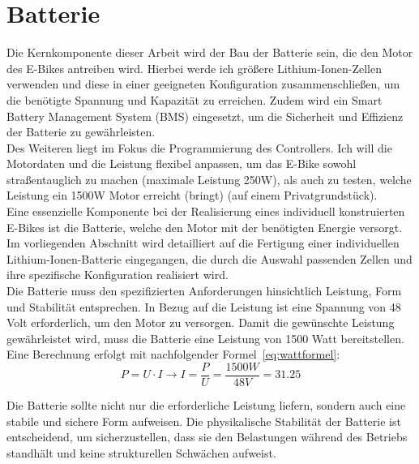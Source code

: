 
\chapter{Batterie}\label{introduction}
Die Kernkomponente dieser Arbeit wird der Bau der Batterie sein, die den Motor des E-Bikes antreiben wird.
Hierbei werde ich größere Lithium-Ionen-Zellen verwenden und diese in einer geeigneten Konfiguration zusammenschließen, um die benötigte Spannung und Kapazität zu erreichen.
Zudem wird ein Smart Battery Management System (BMS) eingesetzt, um die Sicherheit und Effizienz der Batterie zu gewährleisten.\\

Des Weiteren liegt im Fokus die Programmierung des Controllers.
Ich will die Motordaten und die Leistung flexibel anpassen, um das E-Bike sowohl straßentauglich zu machen (maximale Leistung 250W), als auch zu testen, welche Leistung ein 1500W Motor erreicht (bringt) (auf einem Privatgrundstück).\\


Eine essenzielle Komponente bei der Realisierung eines individuell konstruierten E-Bikes ist die Batterie, welche den Motor mit der benötigten Energie versorgt.
Im vorliegenden Abschnitt wird detailliert auf die Fertigung einer individuellen Lithium-Ionen-Batterie eingegangen, die durch die Auswahl passenden Zellen und ihre spezifische Konfiguration realisiert wird.\\

Die Batterie muss den spezifizierten Anforderungen hinsichtlich Leistung, Form und Stabilität entsprechen.
In Bezug auf die Leistung ist eine Spannung von 48 Volt erforderlich, um den Motor zu versorgen.
Damit die gewünschte Leistung gewährleistet wird, muss die Batterie eine Leistung von 1500 Watt bereitstellen.
Eine Berechnung erfolgt mit nachfolgender Formel~\ref{eq:wattformel}:
\begin{equation}
    P = U \cdot I \longrightarrow I = \frac{P}{U}= \frac{1500W}{48V}= 31.25
    \label{eq:wattformel}
\end{equation}
\label{introduction2}

Die Batterie sollte nicht nur die erforderliche Leistung liefern, sondern auch eine stabile und sichere Form aufweisen.
Die physikalische Stabilität der Batterie ist entscheidend, um sicherzustellen, dass sie den Belastungen während des Betriebs standhält und keine strukturellen Schwächen aufweist.\\

